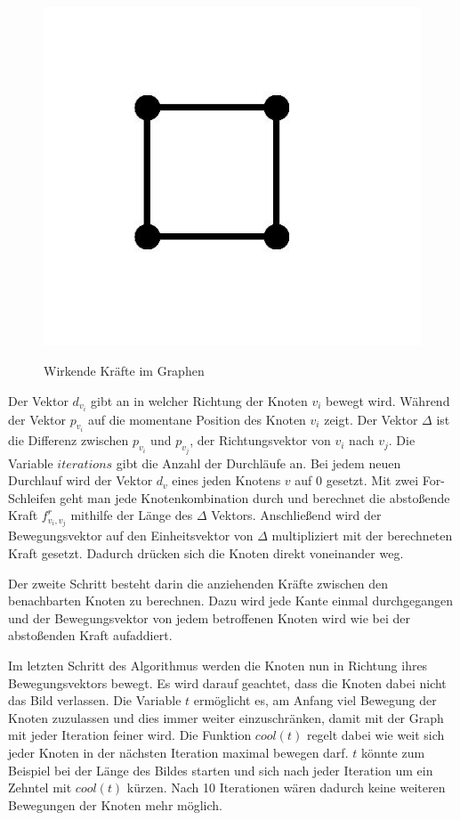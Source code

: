 \begin{figure}[t]
	{\includegraphics[scale=0.3]{bilder/standardgraph}\label{fig_standardgraph}
	}
	\\
	\caption[Wirkende Kräfte im Graphen]{Wirkende Kräfte im Graphen}
	\label{fig_testbild2}
\end{figure} 


Der Vektor $d_{v_{i}}$ gibt an in welcher Richtung der Knoten $v_{i}$ bewegt wird. Während der Vektor $p_{v_{i}}$ auf die momentane Position des Knoten $v_{i}$ zeigt. Der Vektor $\Delta$ ist die Differenz zwischen $p_{v_{i}}$ und $p_{v_{j}}$, der Richtungsvektor von $v_{i}$ nach $v_{j}$. Die Variable $iterations$ gibt die Anzahl der Durchläufe an. Bei jedem neuen Durchlauf wird der Vektor  $d_{v}$  eines jeden Knotens $v$ auf 0 gesetzt. Mit zwei For-Schleifen geht man jede Knotenkombination durch und berechnet die abstoßende Kraft $f^{r}_{v_{i},v_{j}}$ mithilfe der Länge des $\Delta$ Vektors. Anschließend wird der Bewegungsvektor auf den Einheitsvektor von $\Delta$ multipliziert mit der berechneten Kraft gesetzt. Dadurch drücken sich die Knoten direkt voneinander weg.

Der zweite Schritt besteht darin die anziehenden Kräfte zwischen den benachbarten Knoten zu berechnen. Dazu wird jede Kante einmal durchgegangen und der Bewegungsvektor von jedem betroffenen Knoten wird wie bei der abstoßenden Kraft aufaddiert. 

Im letzten Schritt des Algorithmus werden die Knoten nun in Richtung ihres Bewegungsvektors bewegt. Es wird darauf geachtet, dass die Knoten dabei nicht das Bild verlassen. Die Variable $t$ ermöglicht es, am Anfang viel Bewegung der Knoten zuzulassen und dies immer weiter einzuschränken, damit mit der Graph mit jeder Iteration feiner wird. Die Funktion $cool(t)$ regelt dabei wie weit sich jeder Knoten in der nächsten Iteration maximal bewegen darf. $t$ könnte zum Beispiel bei der Länge des Bildes starten und sich nach jeder Iteration um ein Zehntel mit $cool(t)$ kürzen. Nach 10 Iterationen wären dadurch keine weiteren Bewegungen der Knoten mehr möglich.


